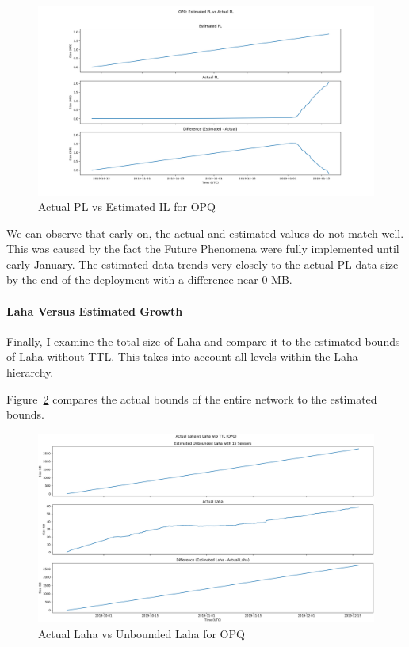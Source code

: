 \begin{figure}[H]
    \centering
    \includegraphics[width=\linewidth]{figures/actual_phenomena_opq_vs_est.png}
    \caption{Actual PL vs Estimated IL for OPQ}
    \label{fig:actual_pl_vs_unbounded_opq}
\end{figure}

We can observe that early on, the actual and estimated values do not match well. This was caused by the fact the Future Phenomena were fully implemented until early January. The estimated data trends very closely to the actual PL data size by the end of the deployment with a difference near 0 MB.

\paragraph{Laha Versus Estimated Growth}
Finally, I examine the total size of Laha and compare it to the estimated bounds of Laha without TTL. This takes into account all levels within the Laha hierarchy.

Figure~\ref{fig:actual_laha_vs_unbounded_opq} compares the actual bounds of the entire network to the estimated bounds.

\begin{figure}[H]
    \centering
    \includegraphics[width=\linewidth]{figures/actual_laha_vs_unbounded_opq.png}
    \caption{Actual Laha vs Unbounded Laha for OPQ}
    \label{fig:actual_laha_vs_unbounded_opq}
\end{figure}

